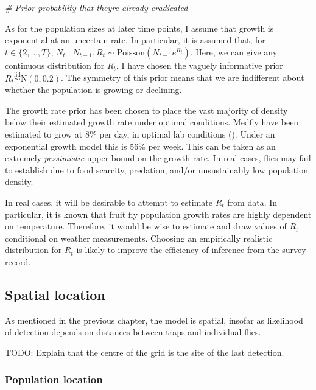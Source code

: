 \documentclass[
]{book}
\newenvironment{Shaded}{\begin{snugshade}}{\end{snugshade}}
\newcommand{\CommentTok}[1]{\textcolor[rgb]{0.56,0.35,0.01}{\textit{#1}}}
\begin{document}
\begin{Shaded}
\begin{Highlighting}[]
\CommentTok{\# Prior probability that they\textquotesingle{}re already eradicated}
\end{Highlighting}
\end{Shaded}

As for the population sizes at later time points, I assume that growth is exponential at an uncertain rate. In particular, it is assumed that, for \(t \in \{2, \ldots, T\}\), \(N_t \mid N_{t-1}, R_t \sim \mathrm{Poisson}(N_{t-1} e^{R_t})\). Here, we can give any continuous distribution for \(R_t\). I have chosen the vaguely informative prior \(R_t \stackrel{\text{iid}} \sim \mathrm N(0, 0.2)\). The symmetry of this prior means that we are indifferent about whether the population is growing or declining.

The growth rate prior has been chosen to place the vast majority of density below their estimated growth rate under optimal conditions. Medfly have been estimated to grow at 8\% per day, in optimal lab conditions (\citet{papadopoulos2002}). Under an exponential growth model this is 56\% per week. This can be taken as an extremely \emph{pessimistic} upper bound on the growth rate. In real cases, flies may fail to establish due to food scarcity, predation, and/or unsustainably low population density.

In real cases, it will be desirable to attempt to estimate \(R_t\) from data. In particular, it is known that fruit fly population growth rates are highly dependent on temperature. Therefore, it would be wise to estimate and draw values of \(R_t\) conditional on weather measurements. Choosing an empirically realistic distribution for \(R_t\) is likely to improve the efficiency of inference from the survey record.

\hypertarget{spatial-location}{%
\subsection{Spatial location}\label{spatial-location}}

As mentioned in the previous chapter, the model is spatial, insofar as likelihood of detection depends on distances between traps and individual flies.

TODO: Explain that the centre of the grid is the site of the last detection.

\hypertarget{population-location}{%
\subsubsection{Population location}\label{population-location}}
\end{document}
